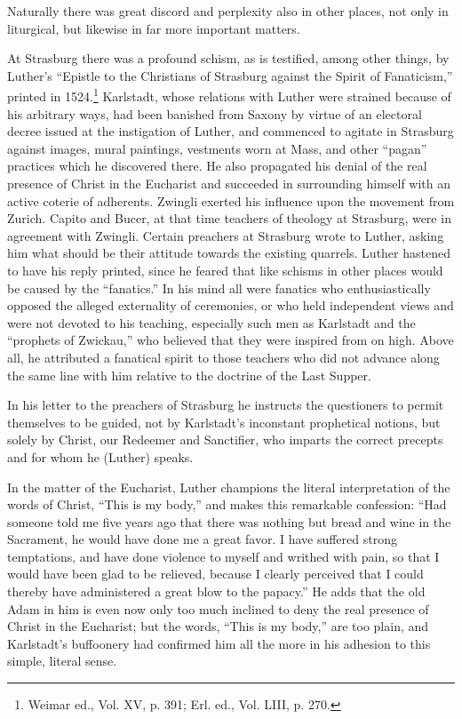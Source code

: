 Naturally there was great discord and perplexity also in other
places, not only in liturgical, but likewise in far more important
matters.

At Strasburg there was a profound schism, as is testified, among
other things, by Luther’s “Epistle to the Christians of Strasburg
against the Spirit of Fanaticism,” printed in 1524.\footnote
{Weimar ed., Vol. XV, p. 391; Erl. ed., Vol. LIII, p. 270.}
Karlstadt, whose
relations with Luther were strained because of his arbitrary ways,
had been banished from Saxony by virtue of an electoral decree issued
at the instigation of Luther, and commenced to agitate in Strasburg
against images, mural paintings, vestments worn at Mass, and other
“pagan” practices which he discovered there. He also propagated his
denial of the real presence of Christ in the Eucharist and succeeded in
surrounding himself with an active coterie of adherents. Zwingli exerted
his influence upon the movement from Zurich. Capito and
Bucer, at that time teachers of theology at Strasburg, were in agreement
with Zwingli. Certain preachers at Strasburg wrote to Luther,
asking him what should be their attitude towards the existing quarrels.
Luther hastened to have his reply printed, since he feared that like
schisms in other places would be caused by the “fanatics.” In his mind
all were fanatics who enthusiastically opposed the alleged externality
of ceremonies, or who held independent views and were not devoted
to his teaching, especially such men as Karlstadt and the “prophets of
Zwickau,” who believed that they were inspired from on high. Above
all, he attributed a fanatical spirit to those teachers who did not advance
along the same line with him relative to the doctrine of the
Last Supper.

In his letter to the preachers of Strasburg he instructs the questioners to
permit themselves to be guided, not by Karlstadt’s inconstant prophetical
notions, but solely by Christ, our Redeemer and Sanctifier, who imparts the
correct precepts and for whom he (Luther) speaks.

In the matter of the Eucharist, Luther champions the literal
interpretation of the words of Christ, “This is my body,” and makes this remarkable
confession: “Had someone told me five years ago that there was nothing
but bread and wine in the Sacrament, he would have done me a great favor.
I have suffered strong temptations, and have done violence to myself and
writhed with pain, so that I would have been glad to be relieved, because
I clearly perceived that I could thereby have administered a great blow to
the papacy.” He adds that the old Adam in him is even now only too much
inclined to deny the real presence of Christ in the Eucharist; but the words,
“This is my body,” are too plain, and Karlstadt’s buffoonery had confirmed
him all the more in his adhesion to this simple, literal sense.

